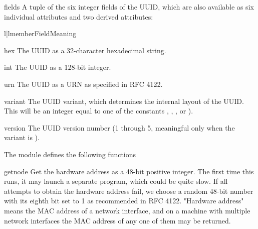 \begin{memberdesc}{fields}
A tuple of the six integer fields of the UUID, which are also available
as six individual attributes and two derived attributes:

\begin{tableii}{l|l}{member}{Field}{Meaning}
\end{tableii}


\end{memberdesc}

\begin{memberdesc}{hex}
The UUID as a 32-character hexadecimal string.
\end{memberdesc}

\begin{memberdesc}{int}
The UUID as a 128-bit integer.
\end{memberdesc}

\begin{memberdesc}{urn}
The UUID as a URN as specified in RFC 4122.
\end{memberdesc}

\begin{memberdesc}{variant}
The UUID variant, which determines the internal layout of the UUID.
This will be an integer equal to one of the constants
,
, , or
).
\end{memberdesc}

\begin{memberdesc}{version}
The UUID version number (1 through 5, meaningful only
when the variant is ).
\end{memberdesc}

The  module defines the following functions

\begin{funcdesc}{getnode}{}
Get the hardware address as a 48-bit positive integer.  The first time this
runs, it may launch a separate program, which could be quite slow.  If all
attempts to obtain the hardware address fail, we choose a random 48-bit
number with its eighth bit set to 1 as recommended in RFC 4122.  "Hardware
address" means the MAC address of a network interface, and on a machine
with multiple network interfaces the MAC address of any one of them may
be returned.
\end{funcdesc}

